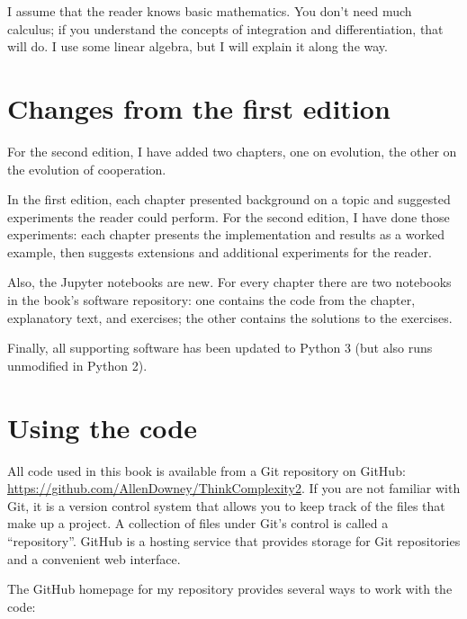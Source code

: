\documentclass[12pt]{book}
\theoremstyle{exercise}
\begin{document}
I assume that the reader knows basic mathematics.  You don't need much calculus; if you understand the concepts of integration and differentiation, that will do.  I use some linear algebra, but I will explain it along the way.


\section{Changes from the first edition}

For the second edition,  I have added two chapters, one on evolution, the other on the evolution of cooperation.

In the first edition, each chapter presented background on a topic and suggested experiments the reader could perform.  For the second edition, I have done those experiments: each chapter presents the implementation and results as a worked example, then suggests extensions and additional experiments for the reader.  

Also, the Jupyter notebooks are new.  For every chapter there are two notebooks in the book's software repository: one contains the code from the chapter, explanatory text, and exercises; the other contains the solutions to the exercises.

Finally, all supporting software has been updated to Python 3 (but also runs unmodified in Python 2).


\section{Using the code}
\label{code}

All code used in this book is available from a Git repository on GitHub:
\url{https://github.com/AllenDowney/ThinkComplexity2}.  
If you are not familiar with Git, it is a 
version control system that allows you to keep track of the files that
make up a project.  A collection of files under Git's control is
called a ``repository''.  GitHub is a hosting service that provides
storage for Git repositories and a convenient web interface.

  

The GitHub homepage for my repository provides several ways to
work with the code:
\end{document}
